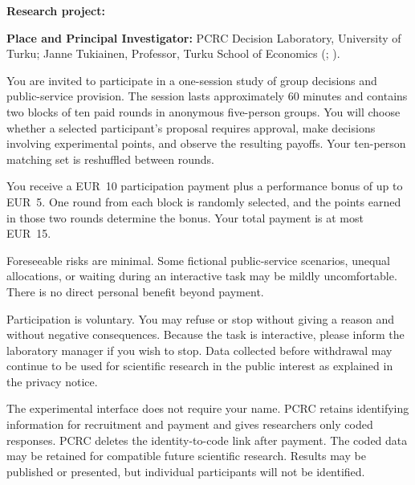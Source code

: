 

\small

\textbf{Research project:} \StudyTitle

\textbf{Place and Principal Investigator:} PCRC Decision Laboratory, University of Turku; Janne Tukiainen, Professor, Turku School of Economics (\StudyEmail; \StudyPhone).

You are invited to participate in a one-session study of group decisions and public-service provision. The session lasts approximately 60 minutes and contains two blocks of ten paid rounds in anonymous five-person groups. You will choose whether a selected participant's proposal requires approval, make decisions involving experimental points, and observe the resulting payoffs. Your ten-person matching set is reshuffled between rounds.

You receive a EUR~10 participation payment plus a performance bonus of up to EUR~5. One round from each block is randomly selected, and the points earned in those two rounds determine the bonus. Your total payment is at most EUR~15.

Foreseeable risks are minimal. Some fictional public-service scenarios, unequal allocations, or waiting during an interactive task may be mildly uncomfortable. There is no direct personal benefit beyond payment.

Participation is voluntary. You may refuse or stop without giving a reason and without negative consequences. Because the task is interactive, please inform the laboratory manager if you wish to stop. Data collected before withdrawal may continue to be used for scientific research in the public interest as explained in the privacy notice.

The experimental interface does not require your name. PCRC retains identifying information for recruitment and payment and gives researchers only coded responses. PCRC deletes the identity-to-code link after payment. The coded data may be retained for compatible future scientific research. Results may be published or presented, but individual participants will not be identified.


